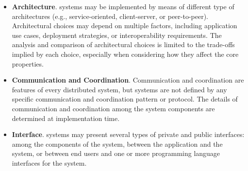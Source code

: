 \documentclass{sig-alternate}
\begin{document}
\begin{itemize}

\item \textbf{Architecture}. \pilot systems may be implemented by means of
  different type of architectures (e.g., service-oriented, client-server, or
  peer-to-peer). Architectural choices may depend on multiple factors, including
  application use cases, deployment strategies, or interoperability
  requirements.  The analysis and comparison of architectural choices is limited
  to the trade-offs implied by each choice, especially when considering how they
  affect the core properties.


    

\item \textbf{Communication and Coordination}. Communication and coordination
  are features of every distributed system, but \pilot systems are not defined
  by any specific communication and coordination pattern or protocol. The
  details of communication and coordination among the \pilot system components
  are determined at implementation time.




\item \textbf{Interface}. \pilot systems may present several types of private
  and public interfaces: among the components of the \pilot system, between the
  application and the \pilot system, or between end users and one or more
  programming language interfaces for the \pilot system.


\end{itemize}
\end{document}
